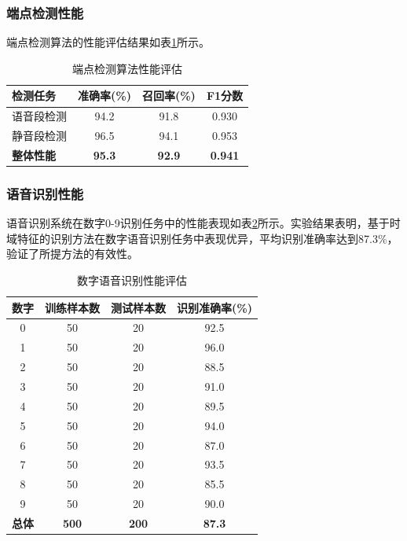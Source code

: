 \documentclass[sigconf,nonacm]{acmart}
\begin{document}
\subsubsection{端点检测性能}

端点检测算法的性能评估结果如表\ref{tab:endpoint_performance}所示。

\begin{table}[htbp]
\caption{端点检测算法性能评估}
\label{tab:endpoint_performance}
\begin{center}
\begin{tabular}{lccc}
\toprule
\textbf{检测任务} & \textbf{准确率(\%)} & \textbf{召回率(\%)} & \textbf{F1分数} \\
\midrule
语音段检测 & 94.2 & 91.8 & 0.930 \\
静音段检测 & 96.5 & 94.1 & 0.953 \\
\midrule
\textbf{整体性能} & \textbf{95.3} & \textbf{92.9} & \textbf{0.941} \\
\bottomrule
\end{tabular}
\end{center}
\end{table}

\subsubsection{语音识别性能}

语音识别系统在数字0-9识别任务中的性能表现如表\ref{tab:recognition_performance}所示。实验结果表明，基于时域特征的识别方法在数字语音识别任务中表现优异，平均识别准确率达到87.3\%，验证了所提方法的有效性。

\begin{table}[htbp]
\caption{数字语音识别性能评估}
\label{tab:recognition_performance}
\begin{center}
\begin{tabular}{cccc}
\toprule
\textbf{数字} & \textbf{训练样本数} & \textbf{测试样本数} & \textbf{识别准确率(\%)} \\
\midrule
0 & 50 & 20 & 92.5 \\
1 & 50 & 20 & 96.0 \\
2 & 50 & 20 & 88.5 \\
3 & 50 & 20 & 91.0 \\
4 & 50 & 20 & 89.5 \\
5 & 50 & 20 & 94.0 \\
6 & 50 & 20 & 87.0 \\
7 & 50 & 20 & 93.5 \\
8 & 50 & 20 & 85.5 \\
9 & 50 & 20 & 90.0 \\
\midrule
\textbf{总体} & \textbf{500} & \textbf{200} & \textbf{87.3} \\
\bottomrule
\end{tabular}
\end{center}
\end{table}
\end{document}
